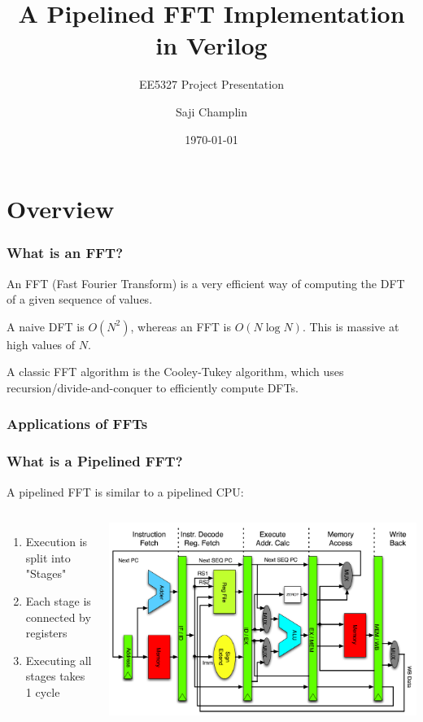 \documentclass{beamer}
\title[Pipelined FFT]{A Pipelined FFT Implementation in Verilog}
\author{Saji Champlin}
\institute{University of Minnesota}
\date{\today}
\subtitle{EE5327 Project Presentation}
\begin{document}
\frame{\titlepage}

\section{Overview}

\begin{frame}
	\frametitle{What is an FFT?}

	An FFT (Fast Fourier Transform) is a very efficient way of computing
	the DFT of a given sequence of values.

	A naive DFT is $O(N^2)$, whereas an FFT is $O(N \log{N})$. This is
	massive at high values of $N$.

	A classic FFT algorithm is the Cooley-Tukey algorithm, which uses
	recursion/divide-and-conquer to efficiently compute DFTs.

\end{frame}


\begin{frame}
	\frametitle{Applications of FFTs}
\end{frame}

\begin{frame}
	\frametitle{What is a Pipelined FFT?}
	A pipelined FFT is similar to a pipelined CPU:
	\begin{columns}
		\begin{enumerate}
			\item Execution is split into "Stages"
			\pause
			\item Each stage is connected by registers
			\pause
			\item Executing all stages takes 1 cycle
		\end{enumerate}
		\onslide
		\centering
		\includegraphics[width=\linewidth]{Pipeline_MIPS.png}
	\end{columns}

\end{frame}
\end{document}
